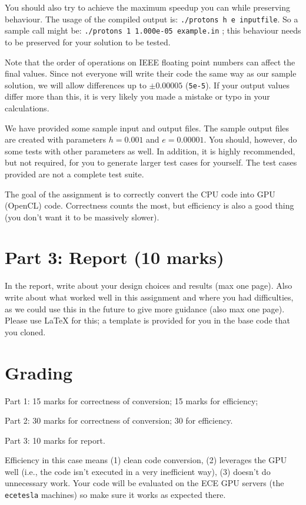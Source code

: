 \documentclass[letterpaper,10pt]{article}
\begin{document}
You should also try to achieve the maximum speedup you can while preserving behaviour. The usage of the compiled output is: \texttt{./protons h e inputfile}. So a sample call might be: \texttt{./protons 1 1.000e-05 example.in} ; this behaviour needs to be preserved for your solution to be tested.

Note that the order of operations on IEEE floating point numbers can affect the final values. Since not everyone will write their code the same way as our sample solution, we will allow differences up to $\pm 0.00005$ (\texttt{5e-5}). If your output values differ more than this, it is very likely you made a mistake or typo in your calculations.

We have provided some sample input and output files. The sample output files are created with parameters $h=0.001$ and $e=0.00001$. You should, however, do some tests with other parameters as well. In addition, it is highly recommended, but not required, for you to generate larger test cases for yourself. The test cases provided are not a complete test suite.

The goal of the assignment is to correctly convert the CPU code into GPU (OpenCL) code. Correctness counts the most, but efficiency is also a good thing (you don't want it to be massively slower). 

\section*{Part 3: Report (10 marks)}
In the report, write about your design choices and results (max one page). Also 
write about what worked well in this assignment and where you had difficulties, as
we could use this in the future to give more guidance (also max one page). Please use LaTeX for this; a template is provided for you in the base code that you cloned. 

\section*{Grading}
Part 1: 15 marks for correctness of conversion; 15 marks for efficiency; 

Part 2: 30 marks for correctness of conversion; 30 for efficiency.

Part 3: 10 marks for report.

Efficiency in this case means (1) clean code conversion, (2) leverages the GPU well (i.e., the code isn't executed in a very inefficient way), (3) doesn't do unnecessary work. Your code will be evaluated on the ECE GPU servers (the \texttt{ecetesla} machines) so make sure it works as expected there. 
\end{document}
